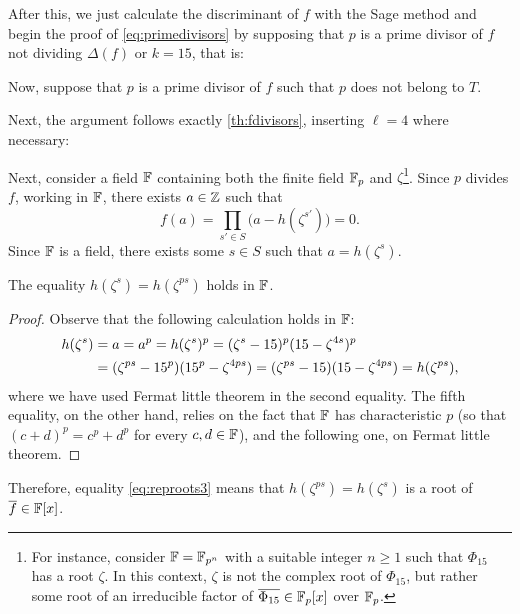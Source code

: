 \documentclass[../main.tex]{subfiles}
\begin{document}
 After this, we just calculate the discriminant of $f$ with the Sage \textcolor{blue}{} method and begin the proof of \cref{eq:primedivisors} by supposing that $p$ is a prime divisor of $f$ not dividing $\Delta(f)$ or $k=15$, that is:\\
 
 \begin{mdframed}\small
Now, suppose that $p$ is a prime divisor of $f$ such that $p$ does not belong to $T$.
 \end{mdframed}
 
 Next, the argument follows exactly \cref{th:fdivisors}, inserting $\ell=4$ where necessary:\\
 
  \begin{mdframed}\small
 	Next, consider a field $\mathbb{F}$ containing both the finite field $\mathbb{F}_p$ and $\zeta$\footnote{For instance, consider $\mathbb{F}=\mathbb{F}_{p^n}$ with a suitable integer $n\geqslant 1$ such that $\Phi_{15}$ has a root $\zeta$. In this context, $\zeta$ is not the complex root of $\Phi_{15}$, but rather some root of an irreducible factor of $\overline{\Phi_{15}}\in\mathbb{F}_p[x]$ over $\mathbb{F}_p$.}. Since $p$ divides $f$, working in $\mathbb{F}$, there exists $a\in\mathbb{Z}$ such that 
 	\begin{equation*}
 		f(a)=\prod_{s'\in S}\big(a-h(\zeta^{s'})\big)=0.
 	\end{equation*}
 	Since $\mathbb{F}$ is a field, there exists some $s\in S$ such that $a=h(\zeta^{s})$.
 	\begin{lemmanonumber}
 		The equality $h(\zeta^s)=h(\zeta^{ps})$ holds in $\mathbb{F}$.
 	\end{lemmanonumber}
 	\begin{proof}
 		Observe that the following calculation holds in $\mathbb{F}$:
 		\begin{align}\label{eq:reproots3}
 			h(\zeta^{s})&=a=a^p=h(\zeta^{s})^p=(\zeta^{s}-15)^p(15-\zeta^{4s})^p\notag \\ 
 			&=(\zeta^{ps}-15^p)(15^p-\zeta^{4ps})=(\zeta^{ps}-15)(15-\zeta^{4ps})=h(\zeta^{ps}),
 		\end{align}
 		where we have used Fermat little theorem in the second equality. The fifth equality, on the other hand, relies on the fact that $\mathbb{F}$ has characteristic $p$ (so that $(c+d)^p=c^p+d^p$ for every $c,d \in \mathbb{F}$), and the following one, on Fermat little theorem.
 	\end{proof}
 	
 	Therefore, equality \cref{eq:reproots3} means that $h(\zeta^{ps})=h(\zeta^{s})$ is a root of $\overline{f}\in\mathbb{F}[x]$. 
 	

\end{mdframed}
\end{document}
